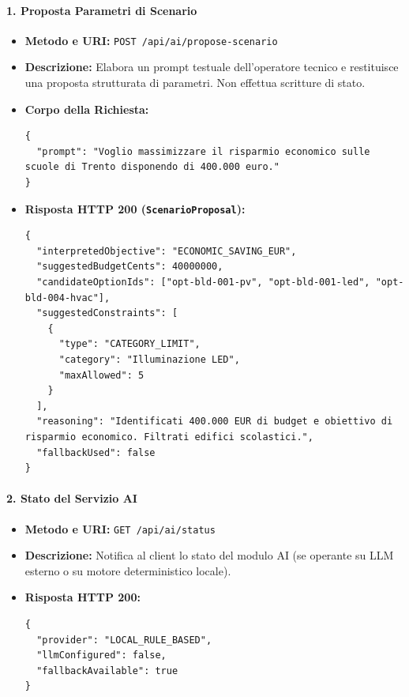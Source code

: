 \paragraph{1. Proposta Parametri di Scenario}
\begin{itemize}[leftmargin=1.4em, itemsep=0.1em]
    \item \textbf{Metodo e URI:} \texttt{POST /api/ai/propose-scenario}
    \item \textbf{Descrizione:} Elabora un prompt testuale dell'operatore tecnico e restituisce una proposta strutturata di parametri. Non effettua scritture di stato.
    \item \textbf{Corpo della Richiesta:}
\begin{lstlisting}
{
  "prompt": "Voglio massimizzare il risparmio economico sulle scuole di Trento disponendo di 400.000 euro."
}
\end{lstlisting}
    \item \textbf{Risposta HTTP 200 (\texttt{ScenarioProposal}):}
\begin{lstlisting}
{
  "interpretedObjective": "ECONOMIC_SAVING_EUR",
  "suggestedBudgetCents": 40000000,
  "candidateOptionIds": ["opt-bld-001-pv", "opt-bld-001-led", "opt-bld-004-hvac"],
  "suggestedConstraints": [
    {
      "type": "CATEGORY_LIMIT",
      "category": "Illuminazione LED",
      "maxAllowed": 5
    }
  ],
  "reasoning": "Identificati 400.000 EUR di budget e obiettivo di risparmio economico. Filtrati edifici scolastici.",
  "fallbackUsed": false
}
\end{lstlisting}
\end{itemize}

\paragraph{2. Stato del Servizio AI}
\begin{itemize}[leftmargin=1.4em, itemsep=0.1em]
    \item \textbf{Metodo e URI:} \texttt{GET /api/ai/status}
    \item \textbf{Descrizione:} Notifica al client lo stato del modulo AI (se operante su LLM esterno o su motore deterministico locale).
    \item \textbf{Risposta HTTP 200:}
\begin{lstlisting}
{
  "provider": "LOCAL_RULE_BASED",
  "llmConfigured": false,
  "fallbackAvailable": true
}
\end{lstlisting}
\end{itemize}
